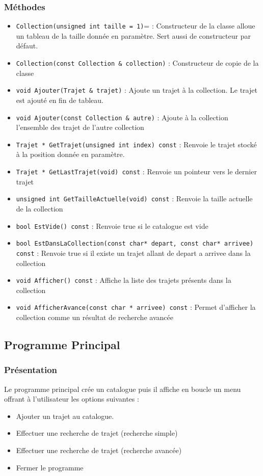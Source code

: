 \documentclass[10pt,a4paper,twoside]{article}
\begin{document}
\subsubsection{Méthodes}
\begin{itemize}
\item \verb$Collection(unsigned int taille = 1)$= : Constructeur de la classe alloue un tableau de la taille donnée en paramètre. Sert aussi de constructeur par défaut.
\item \verb=Collection(const Collection & collection)= : Constructeur de copie de la classe
\item \verb=void Ajouter(Trajet & trajet)= : Ajoute un trajet à la collection. Le trajet est ajouté en fin de tableau.
\item \verb=void Ajouter(const Collection & autre)= : Ajoute à la collection l'ensemble des trajet de l'autre collection
\item \verb=Trajet * GetTrajet(unsigned int index) const= : Renvoie le trajet stocké à la position donnée en paramètre.
\item \verb=Trajet * GetLastTrajet(void) const= : Renvoie un pointeur vers le dernier trajet
\item \verb=unsigned int GetTailleActuelle(void) const= : Renvoie la taille actuelle de la collection
\item \verb=bool EstVide() const= : Renvoie true si le catalogue est vide
\item \verb=bool EstDansLaCollection(const char* depart, const char* arrivee) const= : Renvoie true si il existe un trajet allant de depart a arrivee dans la collection
\item \verb=void Afficher() const= : Affiche la liste des trajets présents dans la collection
\item \verb=void AfficherAvance(const char * arrivee) const= : Permet d'afficher la collection comme un résultat de recherche avancée
\end{itemize}

\subsection{Programme Principal}
\subsubsection{Présentation}
Le programme principal crée un catalogue puis il affiche en boucle un menu offrant à l'utilisateur les options suivantes :
\begin{itemize}
\item Ajouter un trajet au catalogue.
\item Effectuer une recherche de trajet (recherche simple)
\item Effectuer une recherche de trajet (recherche avancée)
\item Fermer le programme 
\end{itemize}
\end{document}
